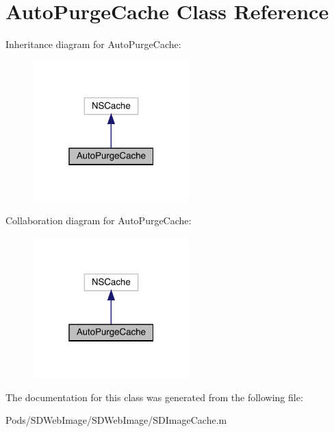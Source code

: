 \hypertarget{interface_auto_purge_cache}{}\section{Auto\+Purge\+Cache Class Reference}
\label{interface_auto_purge_cache}


Inheritance diagram for Auto\+Purge\+Cache\+:\nopagebreak
\begin{figure}[H]
\begin{center}
\leavevmode
\includegraphics[width=172pt]{interface_auto_purge_cache__inherit__graph}
\end{center}
\end{figure}


Collaboration diagram for Auto\+Purge\+Cache\+:\nopagebreak
\begin{figure}[H]
\begin{center}
\leavevmode
\includegraphics[width=172pt]{interface_auto_purge_cache__coll__graph}
\end{center}
\end{figure}


The documentation for this class was generated from the following file\+:\begin{DoxyCompactItemize}
\item 
Pods/\+S\+D\+Web\+Image/\+S\+D\+Web\+Image/S\+D\+Image\+Cache.\+m\end{DoxyCompactItemize}

